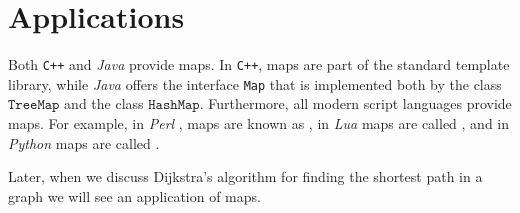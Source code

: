 \section{Applications}
Both \texttt{C++} and \textsl{Java} provide maps.  In \texttt{C++}, maps are part of the standard
template library, while \textsl{Java} offers the interface \texttt{Map} that is implemented both by
the class $\texttt{TreeMap}$ and the class $\texttt{HashMap}$. Furthermore, all modern script languages provide maps.
For example, in \textsl{Perl} \cite{Wall92}, maps are known as , in \textsl{Lua} 
\cite{ierusalimschy:2006,Ieru96a} maps are called , and in \textsl{Python} 
\cite{vanRossum:95,lutz:09} maps are called .  

Later, when we discuss Dijkstra's algorithm for finding the shortest path in a graph we will see an
application of maps.

